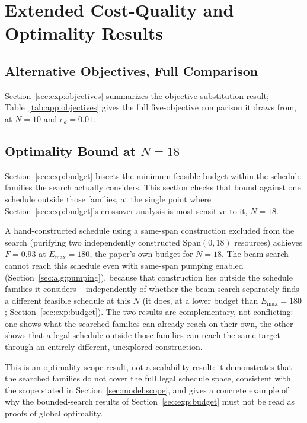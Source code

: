 \section{Extended Cost-Quality and Optimality Results}
\label{app:costquality}

\subsection{Alternative Objectives, Full Comparison}
\label{app:objectives}

Section~\ref{sec:exp:objectives} summarizes the objective-substitution result; Table~\ref{tab:app:objectives} gives the full five-objective comparison it draws from, at $N=10$ and $e_d=0.01$.



\subsection{Optimality Bound at $N=18$}
\label{sec:exp:excluded}


Section~\ref{sec:exp:budget} bisects the minimum feasible budget within the schedule families the search actually considers. This section checks that bound against one schedule outside those families, at the single point where Section~\ref{sec:exp:budget}'s crossover analysis is most sensitive to it, $N=18$.

A hand-constructed schedule using a same-span construction excluded from the search (purifying two independently constructed $\mathrm{Span}(0,18)$ resources) achieves $F=0.93$ at $E_{\max}=180$, the paper's own budget for $N=18$. The beam search cannot reach this schedule even with same-span pumping enabled (Section~\ref{sec:alg:pumping}), because that construction lies outside the schedule families it considers -- independently of whether the beam search separately finds a different feasible schedule at this $N$ (it does, at a lower budget than $E_{\max}=180$; Section~\ref{sec:exp:budget}). The two results are complementary, not conflicting: one shows what the searched families can already reach on their own, the other shows that a legal schedule outside those families can reach the same target through an entirely different, unexplored construction.

This is an optimality-scope result, not a scalability result: it demonstrates that the searched families do not cover the full legal schedule space, consistent with the scope stated in Section~\ref{sec:model:scope}, and gives a concrete example of why the bounded-search results of Section~\ref{sec:exp:budget} must not be read as proofs of global optimality.

